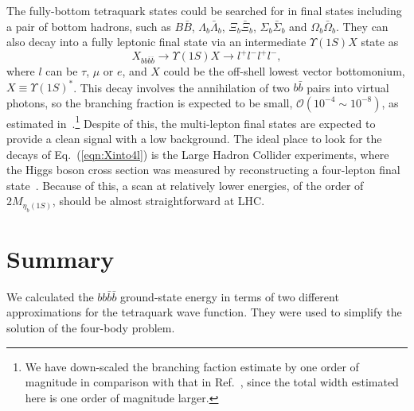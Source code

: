\documentclass[twocolumn,showpacs,superscriptaddress,preprintnumbers,nofootinbib,prd]{revtex4-1}
\def\be{\begin{equation}}
\def\ee{\end{equation}}
\begin{document}
The fully-bottom tetraquark states could be searched for in final states
including a pair of bottom hadrons, such as $B\bar B$, $\Lambda_b\bar
\Lambda_b$, $\Xi_b\bar \Xi_b$, $\Sigma_b\bar \Sigma_b$ and $\Omega_b\bar \Omega_b$.
They can also decay into a fully leptonic final state via an intermediate
$\Upsilon(1S)X$ state as
\be
\label{eqn:Xinto4l}
X_{bb\bar{b}\bar{b}} \to \Upsilon(1S)X \to l^+l^- l^+l^-,
\ee
where $l$ can be $\tau$, $\mu$ or $e$, and $X$ could be the off-shell lowest
vector bottomonium, $X\equiv\Upsilon(1S)^*$.
This decay involves the annihilation of two $b\bar{b}$ pairs into virtual
photons, so the branching fraction is
expected to be small, $\mathcal O (10^{-4}\sim 10^{-8})$, as estimated
in~\cite{Karliner:2016zzc}.\footnote{We have down-scaled the branching faction
estimate by one order of magnitude in comparison with that in
Ref.~\cite{Karliner:2016zzc}, since the total width estimated here is one order
of magnitude larger.} Despite of this, the multi-lepton final states are expected
to provide a clean signal with a low background.
The ideal place to look for the decays of Eq.~(\ref{eqn:Xinto4l}) is the Large
Hadron Collider experiments, where the Higgs boson cross section was measured by
reconstructing a four-lepton final state~\cite{cms:2015yvw}.
Because of this, a scan at relatively lower energies, of the order of
$2M_{\eta_{b}(1S)}$, should be almost straightforward
at LHC.


\section{Summary}

We calculated the $b b \bar b \bar b$ ground-state energy in terms of
two different approximations for the tetraquark wave function.
They were used to simplify the solution of the four-body problem.
\end{document}
